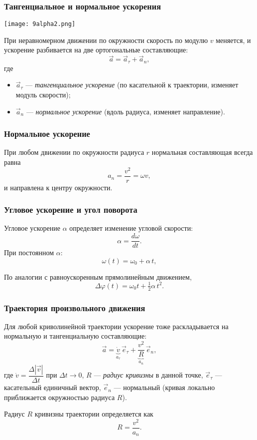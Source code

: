 \documentclass[12pt, a4paper]{article}%
\begin{document}
\subsubsection*{Тангенциальное и нормальное ускорения}


\begin{center}
\texttt{[image: 9alpha2.png]}
\label{fig:mpr}
\end{center}

При неравномерном движении по окружности скорость по модулю $v$ меняется, и ускорение разбивается на две ортогональные составляющие:
\[
\vec a = \vec a_\tau + \vec a_n,
\]
где 
\begin{itemize}
	\item \(\vec a_\tau\) — \textit{тангенциальное ускорение} (по касательной к траектории, изменяет модуль скорости);
	\item \(\vec a_n\) — \textit{нормальное ускорение} (вдоль радиуса, изменяет направление).
\end{itemize}

\subsubsection*{Нормальное ускорение}
При любом движении по окружности радиуса $r$ нормальная составляющая всегда равна
\[
a_n = \frac{v^2}{r} = \omega v,
\]
и направлена к центру окружности.

\subsubsection*{Угловое ускорение и угол поворота}
Угловое ускорение $\alpha$ определяет изменение угловой скорости:
\[
\alpha = \frac{d\omega}{dt}.
\]
При постоянном $\alpha$:
\[
\omega(t) = \omega_0 + \alpha\,t,
\]

По аналогии с равноускоренным прямолинейным движением, 
\[
\Delta \varphi(t) = \omega_0t + \tfrac12\alpha\,t^2.
\]

\subsubsection*{Траектория произвольного движения}
Для любой криволинейной траектории ускорение тоже раскладывается на нормальную и тангенциальную составляющие:
\[
\vec a = \underbrace{\dot v}_{a_\tau}\,\vec e_\tau + \underbrace{\frac{v^2}{R}}_{a_n}\,\vec e_n,
\]
где $\dot v = \dfrac{\Delta |\vec v|}{\Delta t}$ при $\Delta t \to 0$, $R$ — \textit{радиус кривизны} в данной точке, $\vec e_\tau$ — касательный единичный вектор, $\vec e_n$ — нормальный (кривая локально приближается окружностью радиуса $R$).




Радиус $R$ кривизны траектории определяется как 
\[
R = \frac{v^2}{a_n}.
\]
\end{document}
